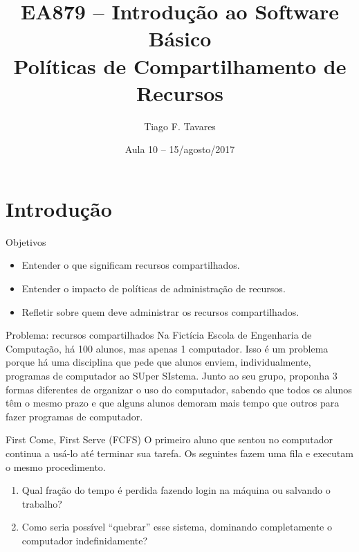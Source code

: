 \documentclass{beamer}
\title[10-compartilhamento-de-recursos]{EA879 -- Introdução ao Software
Básico\\Políticas de Compartilhamento de Recursos}
\author{Tiago F. Tavares}
\institute{FEEC -- UNICAMP}
\date{Aula 10 -- 15/agosto/2017}
\begin{document}
\begin{frame}
  \titlepage
\end{frame}


\section{Introdução}

\begin{frame}{Objetivos}
  \Large
  \begin{itemize}
    \item Entender o que significam recursos compartilhados.
    \item Entender o impacto de políticas de administração de recursos.
    \item Refletir sobre quem deve administrar os recursos compartilhados.
  \end{itemize}
\end{frame}


\begin{frame}[fragile]{Problema: recursos compartilhados}
  \centering
  \large
  Na Fictícia Escola de Engenharia de Computação, há 100 alunos, mas apenas 1
  computador. Isso é um problema porque há uma disciplina que pede que alunos
  enviem, individualmente, programas de computador ao SUper SIstema. Junto ao
  seu grupo, proponha 3 formas diferentes de organizar o uso do computador,
  sabendo que todos os alunos têm o mesmo prazo e que alguns alunos demoram mais
  tempo que outros para fazer programas de computador.
\end{frame}

\begin{frame}[fragile]{First Come, First Serve (FCFS)}
  \centering
  \large
  O primeiro aluno que sentou no computador continua a usá-lo até terminar sua
  tarefa. Os seguintes fazem uma fila e executam o mesmo procedimento.
  \begin{enumerate}
  \item Qual fração do tempo é perdida fazendo login na máquina ou salvando
      o trabalho?
  \item Como seria possível ``quebrar'' esse sistema, dominando completamente o
    computador indefinidamente?

  \end{enumerate}
\end{frame}
\end{document}
